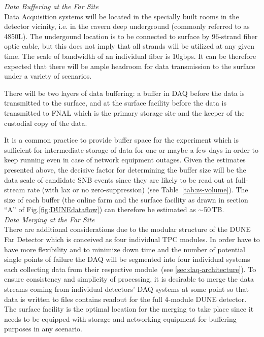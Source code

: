 \noindent
\textit{Data Buffering at the Far Site} 
\ 
\\


\noindent
Data Acquisition systems will be located in the specially built rooms in the detector vicinity,
i.e. in the cavern deep underground (commonly referred to as 4850L). The undergound location is to be
connected to surface by 96-strand fiber optic cable, but this does not imply that all strands will be
utilized at any given time. The scale of bandwidth of an individual fiber is 10gbps. It can be therefore
expected that there will be ample headroom for data transmission to the surface under a variety of scenarios.

There will be two layers of data buffering: a buffer in DAQ before the data is transmitted to the surface,
and at the surface facility before the data is transmitted to FNAL which is the primary storage site and the
keeper of the custodial copy of the data.

It is a common practice to provide buffer space for the experiment which is sufficient for intermediate storage of data
for one or maybe a few days in order to keep running even in case of network equipment outages. Given the estimates
presented above, the decisive factor for determining the buffer size will be the data scale of candidate SNB events since
they are likely to be read out at full-stream rate (with lax or no zero-suppression) (see Table~\ref{tab:zs-volume}). The
size of each buffer (the online farm and the surface facility as drawn in section ``A'' of Fig.\ref{fig:DUNEdataflow})
can therefore be estimated as $\sim$50\,TB.
\ 
\\

\noindent
\textit{Data Merging at the Far Site} 
\ 
\\


\noindent
There are additional considerations due to the modular structure of the DUNE Far Detector
which is conceived as four individual TPC modules. In order have to have more flexibility and to minimize down time
and the number of potential single points of failure the DAQ will be segmented into four individual  systems each collecting
data from their respective module~(see \ref{sec:daq-architecture}). To ensure
consistency and simplicity of processing, it is desirable to merge the data streams coming from individual
detectors' DAQ systems at some point so that data is written to files contains readout for the full 4-module
DUNE detector. The surface facility is the optimal location for the merging to take place since it needs to be
equipped with storage and networking equipment for buffering purposes in any scenario.

